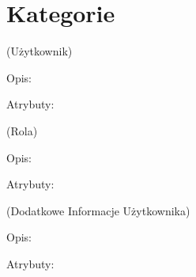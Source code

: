 \section{Kategorie}

\begin{enumerate}[label={\textbf{KAT/\protect\threedigits{\theenumi}}}, wide, labelwidth=!, labelindent=0pt, labelsep=0pt, series=reqs]
    \setlength\itemsep{1em}
     \label{kat:User} (Użytkownik)

    Opis: \lipsum[1]
    \par
    Atrybuty:
    \begin{itemize}[series=atr]
         \label{kat:User:id}
         \label{kat:User:login}
         \label{kat:User:passwordHash}
         \label{kat:User:firstName}
         \label{kat:User:lastName}
         \label{kat:User:email}
         \label{kat:User:image}
         \label{kat:User:activated}
         \label{kat:User:langKey}
         \label{kat:User:activationKey}
         \label{kat:User:resetKey}
         \label{kat:User:createdDate}
         \label{kat:User:resetDate}
         \label{kat:User:lastModifiedDate}
    \end{itemize}

     \label{kat:Authority} (Rola)

    Opis: \lipsum[1]
    \par
    Atrybuty:
    \begin{itemize}[series=atr]
         \label{kat:Authority:name}
    \end{itemize}

     \label{kat:UserExtraInfo} (Dodatkowe Informacje Użytkownika)

    Opis: \lipsum[1]
    \par
    Atrybuty:
    \begin{itemize}[series=atr]
         \label{kat:UserExtraInfo:id}
         \label{kat:UserExtraInfo:gender}
         \label{kat:UserExtraInfo:dateOfBirth}
         \label{kat:UserExtraInfo:phoneNumber}
         \label{kat:UserExtraInfo:streetAddress}
         \label{kat:UserExtraInfo:postalCode}
         \label{kat:UserExtraInfo:city}
         \label{kat:UserExtraInfo:country}
         \label{kat:UserExtraInfo:personalDescription}
    \end{itemize}


\end{enumerate}
